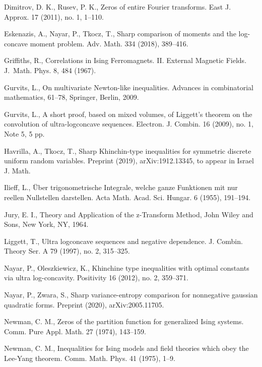 \documentclass[10pt]{article}
\newcommand{\1}{\textbf{1}}
\theoremstyle{remark}
\theoremstyle{definition}
\begin{document}
\begin{thebibliography}{9}

Dimitrov, D. K., Rusev, P. K.,
Zeros of entire Fourier transforms.
East J. Approx. 17 (2011), no. 1, 1--110.


Eskenazis, A., Nayar, P., Tkocz, T., Sharp comparison of moments and the log-concave moment problem. Adv. Math. 334 (2018), 389--416.


Griffiths, R.,
Correlations in Ising Ferromagnets. II. External Magnetic Fields.
J.~Math. Phys. 8, 484 (1967).


Gurvits, L.,
On multivariate Newton-like inequalities. Advances in combinatorial mathematics, 61--78, Springer, Berlin, 2009.


Gurvits, L.,
A short proof, based on mixed volumes, of Liggett's theorem on the convolution of ultra-logconcave sequences. Electron. J. Combin. 16 (2009), no. 1, Note 5, 5 pp.


Havrilla, A., Tkocz, T.,
Sharp Khinchin-type inequalities for symmetric discrete uniform random variables. Preprint (2019), arXiv:1912.13345, to appear in Israel J. Math.




Ilieff, L.,
\"Uber trigonometrische Integrale, welche ganze Funktionen mit nur reellen Nullstellen darstellen. Acta Math. Acad. Sci. Hungar. 6 (1955), 191--194.


Jury, E. I., Theory and Application of the z-Transform Method, John Wiley and Sons, New York, NY, 1964.



Liggett, T.,
Ultra logconcave sequences and negative dependence.
J. Combin. Theory Ser. A 79 (1997), no. 2, 315--325.


Nayar, P., Oleszkiewicz, K.,
Khinchine type inequalities with optimal constants via ultra log-concavity.
Positivity 16 (2012), no. 2, 359--371. 


Nayar, P., Zwara, S.,
Sharp variance-entropy comparison for nonnegative gaussian quadratic forms. Preprint (2020), arXiv:2005.11705.




Newman, C. M.,
Zeros of the partition function for generalized Ising systems.
Comm. Pure Appl. Math. 27 (1974), 143--159.


Newman, C. M.,
Inequalities for Ising models and field theories which obey the Lee-Yang theorem.
Comm. Math. Phys. 41 (1975), 1--9.



\end{thebibliography}
\end{document}
